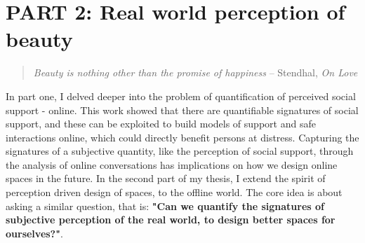 \chapter{PART 2: Real world perception of beauty}
\label{chap:quant_perception}


\graphicspath{{Chapter4/plots/} {Chapter4/plots/examples/} {Chapter4/plots/GAN_examples/}}
\begin{quote}
    \textsl{Beauty is nothing other than the promise of happiness}
    -- Stendhal, \textsl{On Love}
\end{quote}

In part one, I delved deeper into the problem of quantification of perceived social support - online. This work showed that there are quantifiable signatures of social support, and these can be exploited to build models of support and safe interactions online, which could directly benefit persons at distress. Capturing the signatures of a subjective quantity, like the perception of social support, through the analysis of online conversations has implications on how we design online spaces in the future. In the second part of my thesis, I extend the spirit of perception driven design of spaces, to the offline world. The core idea is about asking a similar question, that is: \textbf{"Can we quantify the signatures of subjective perception of the real world, to design better spaces for ourselves?"}. 

